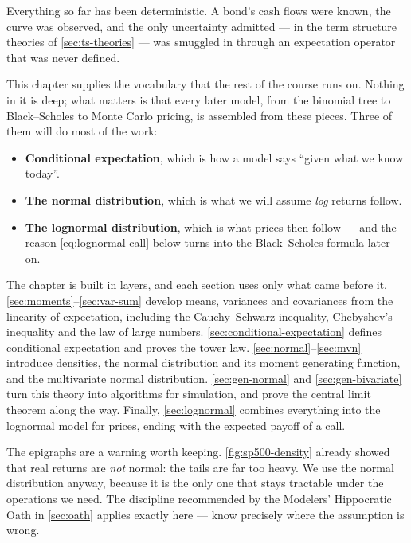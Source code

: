 \bigskip

\suppstart
\noindent Everything so far has been deterministic.
A bond's cash flows were known, the curve was observed, and the only uncertainty admitted --- in the term structure theories of \autoref{sec:ts-theories} --- was smuggled in through an expectation operator that was never defined.

This chapter supplies the vocabulary that the rest of the course runs on.
Nothing in it is deep; what matters is that every later model, from the binomial tree to Black--Scholes to Monte Carlo pricing, is assembled from these pieces.
Three of them will do most of the work:

\begin{itemize}[nosep]
	\item \textbf{Conditional expectation}, which is how a model says ``given what we know today''.
	\item \textbf{The normal distribution}, which is what we will assume \emph{log} returns follow.
	\item \textbf{The lognormal distribution}, which is what prices then follow --- and the reason \eqref{eq:lognormal-call} below turns into the Black--Scholes formula later on.
\end{itemize}

The chapter is built in layers, and each section uses only what came before it.
\autoref{sec:moments}--\autoref{sec:var-sum} develop means, variances and covariances from the linearity of expectation, including the Cauchy--Schwarz inequality, Chebyshev's inequality and the law of large numbers.
\autoref{sec:conditional-expectation} defines conditional expectation and proves the tower law.
\autoref{sec:normal}--\autoref{sec:mvn} introduce densities, the normal distribution and its moment generating function, and the multivariate normal distribution.
\autoref{sec:gen-normal} and \autoref{sec:gen-bivariate} turn this theory into algorithms for simulation, and prove the central limit theorem along the way.
Finally, \autoref{sec:lognormal} combines everything into the lognormal model for prices, ending with the expected payoff of a call.

\begin{note}
	The epigraphs are a warning worth keeping.
	\autoref{fig:sp500-density} already showed that real returns are \emph{not} normal: the tails are far too heavy.
	We use the normal distribution anyway, because it is the only one that stays tractable under the operations we need.
	The discipline recommended by the Modelers' Hippocratic Oath in \autoref{sec:oath} applies exactly here --- know precisely where the assumption is wrong.
\end{note}
\suppend

